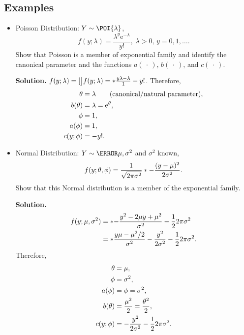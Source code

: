\documentclass{article}\usepackage[]{graphicx}\usepackage[svgnames]{xcolor}
\let\exp\relax%
\let\log\relax%
\begin{document}
\subsection*{Examples}
\begin{itemize}
    \item Poisson Distribution: $ Y \sim \POI{\lambda} $,
          \[ f(y;\lambda)=\frac{\lambda^y \mathrm{e}^{-\lambda}}{y!},\; \lambda>0,\, y=0,1,\ldots.  \]
          Show that Poisson is a member of exponential family and identify the canonical
          parameter and the functions $ a(\:\cdot\:) $, $ b(\:\cdot\:) $, and $ c(\:\cdot\:) $.

          \textbf{Solution.} $ f(y;\lambda)=\exp[\big]{\log{f(y;\lambda)}}=\exp*{\frac{y\log{\lambda}-\lambda}{1} -\log{y!}} $. Therefore,
          \begin{align*}
              \theta    & =\log{\lambda}\qquad\text{(canonical/natural parameter)}, \\
              b(\theta) & =\lambda=\mathrm{e}^{\theta},                             \\
              \phi      & =1,                                                       \\
              a(\phi)   & =1,                                                       \\
              c(y;\phi) & =-\log{y!}.
          \end{align*}
    \item Normal Distribution: $ Y \sim \N{\mu,\sigma^2} $ and $ \sigma^2 $ known,
          \[ f(y;\theta,\phi)=\frac{1}{\sqrt{2\pi\sigma^2}}\exp*{-\frac{(y-\mu)^2}{2\sigma^2}}. \]
          Show that this Normal distribution is a member of the exponential family.

          \textbf{Solution.}
          \begin{align*}
              f(y;\mu,\sigma^2)
               & =\exp*{-\frac{y^2-2\mu y+\mu^2}{\sigma^2}-\frac{1}{2} \log{2\pi\sigma^2}}                   \\
               & =\exp*{\frac{y\mu-\mu^2/2}{\sigma^2}-\frac{y^2}{2\sigma^2}-\frac{1}{2} \log{2\pi\sigma^2}}.
          \end{align*}
          Therefore,
          \begin{align*}
              \theta    & =\mu,                                                   \\
              \phi      & =\sigma^2,                                              \\
              a(\phi)   & =\phi=\sigma^2,                                         \\
              b(\theta) & =\frac{\mu^2}{2}=\frac{\theta^2}{2},                    \\
              c(y;\phi) & =-\frac{y^2}{2\sigma^2}-\frac{1}{2} \log{2\pi\sigma^2}.
          \end{align*}
\end{itemize}
\end{document}

